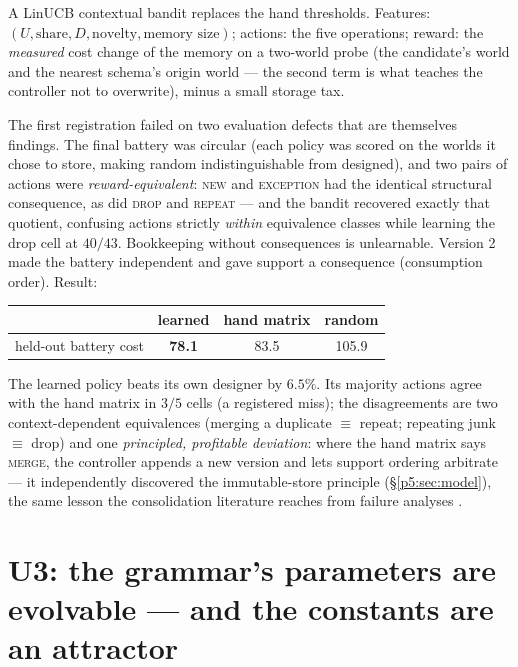 \documentclass{article}
\begin{document}
A LinUCB contextual bandit replaces the hand thresholds. Features:
$(U, \text{share}, D, \text{novelty}, \text{memory size})$; actions:
the five operations; reward: the \emph{measured} cost change of the
memory on a two-world probe (the candidate's world and the nearest
schema's origin world --- the second term is what teaches the
controller not to overwrite), minus a small storage tax.

The first registration failed on two evaluation defects that are
themselves findings. The final battery was circular (each policy was
scored on the worlds it chose to store, making random indistinguishable
from designed), and two pairs of actions were
\emph{reward-equivalent}: \textsc{new} and \textsc{exception} had the
identical structural consequence, as did \textsc{drop} and
\textsc{repeat} --- and the bandit recovered exactly that quotient,
confusing actions strictly \emph{within} equivalence classes while
learning the drop cell at $40/43$. Bookkeeping without consequences
is unlearnable. Version 2 made the battery independent and gave
support a consequence (consumption order). Result:

\begin{center}
\small
\begin{tabular}{lccc}
\toprule
 & learned & hand matrix & random \\
\midrule
held-out battery cost & \textbf{78.1} & 83.5 & 105.9 \\
\bottomrule
\end{tabular}
\end{center}

The learned policy beats its own designer by $6.5\%$. Its majority
actions agree with the hand matrix in $3/5$ cells (a registered
miss); the disagreements are two context-dependent equivalences
(merging a duplicate $\equiv$ repeat; repeating junk $\equiv$ drop)
and one \emph{principled, profitable deviation}: where the hand
matrix says \textsc{merge}, the controller appends a new version and
lets support ordering arbitrate --- it independently discovered the
immutable-store principle (\S\ref{p5:sec:model}), the same lesson the
consolidation literature reaches from failure analyses
\citep{trustmem2026,faulty2026}.

\section{U3: the grammar's parameters are evolvable --- and the
constants are an attractor}
\label{p5:sec:u3}
\end{document}
